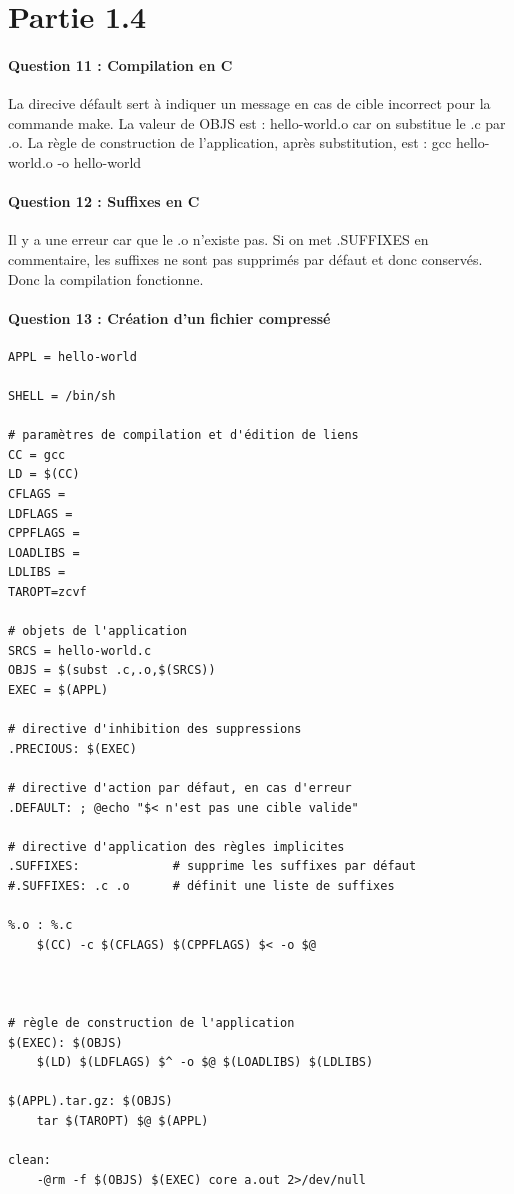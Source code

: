 \documentclass{article}
\begin{document}
\section{Partie 1.4}
\paragraph{Question 11 : Compilation en C}
La direcive défault sert à indiquer un message en cas de cible incorrect pour la commande make.
La valeur de OBJS est : hello-world.o car on substitue le .c par .o.
La règle de construction de l'application, après substitution, est : 
gcc  hello-world.o -o hello-world 

\paragraph{Question 12 : Suffixes en C}
Il y a une erreur car que le .o n'existe pas.
Si on met .SUFFIXES en commentaire, les suffixes ne sont pas supprimés par défaut et donc conservés. Donc la compilation fonctionne.

\paragraph{Question 13 : Création d'un fichier compressé}
\begin{verbatim}
APPL = hello-world

SHELL = /bin/sh

# paramètres de compilation et d'édition de liens
CC = gcc
LD = $(CC)
CFLAGS =
LDFLAGS =
CPPFLAGS =
LOADLIBS =
LDLIBS =
TAROPT=zcvf

# objets de l'application
SRCS = hello-world.c 
OBJS = $(subst .c,.o,$(SRCS))
EXEC = $(APPL)

# directive d'inhibition des suppressions
.PRECIOUS: $(EXEC)

# directive d'action par défaut, en cas d'erreur
.DEFAULT: ; @echo "$< n'est pas une cible valide"
	
# directive d'application des règles implicites
.SUFFIXES:             # supprime les suffixes par défaut
#.SUFFIXES: .c .o      # définit une liste de suffixes

%.o : %.c
	$(CC) -c $(CFLAGS) $(CPPFLAGS) $< -o $@


		  
# règle de construction de l'application
$(EXEC): $(OBJS)
	$(LD) $(LDFLAGS) $^ -o $@ $(LOADLIBS) $(LDLIBS)

$(APPL).tar.gz: $(OBJS)
	tar $(TAROPT) $@ $(APPL)

clean:
	-@rm -f $(OBJS) $(EXEC) core a.out 2>/dev/null
\end{verbatim}
\end{document}
